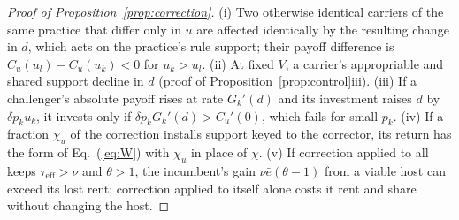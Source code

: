 \documentclass[letterpaper]{article} %
\theoremstyle{definition}
\newcommand{\taueff}{\tau_{\mathrm{eff}}}
\begin{document}
\begin{proof}[Proof of Proposition~\ref{prop:correction}]
(i) Two otherwise identical carriers of the same practice that differ only in $u$ are affected identically by the resulting change in $d$, which acts on the practice's rule support; their payoff difference is $C_u(u_l)-C_u(u_k)<0$ for $u_k>u_l$. (ii) At fixed $V$, a carrier's appropriable and shared support decline in $d$ (proof of Proposition~\ref{prop:control}iii). (iii) If a challenger's absolute payoff rises at rate $G_k'(d)$ and its investment raises $d$ by $\delta p_ku_k$, it invests only if $\delta p_kG_k'(d)>C_u'(0)$, which fails for small $p_k$. (iv) If a fraction $\chi_u$ of the correction installs support keyed to the corrector, its return has the form of Eq.~(\ref{eq:W}) with $\chi_u$ in place of $\chi$. (v) If correction applied to all keeps $\taueff>\nu$ and $\theta>1$, the incumbent's gain $\nu\bar e(\theta-1)$ from a viable host can exceed its lost rent; correction applied to itself alone costs it rent and share without changing the host.
\end{proof}
\end{document}
